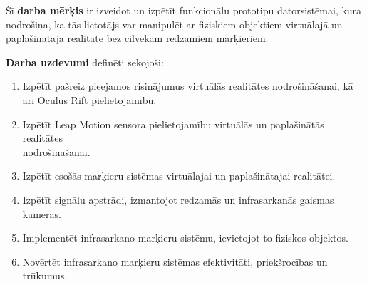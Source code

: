 \documentclass[12pt, a4paper, oneside, openright]{article}
\begin{document}
\par
Šī \textbf{darba mērķis} ir izveidot un izpētīt funkcionālu prototipu datorsistēmai, kura nodrošina,
ka tās lietotājs var manipulēt ar fiziskiem objektiem virtuālajā un paplašinātajā realitātē bez cilvēkam redzamiem 
marķieriem.

\par
\textbf{Darba uzdevumi} definēti sekojoši:
\begin{enumerate}
\item Izpētīt pašreiz pieejamos risinājumus virtuālās realitātes
nodrošināšanai, kā arī Oculus Rift pielietojamību.
\item Izpētīt Leap Motion sensora pielietojamību virtuālās un paplašinātās realitātes \\ nodrošināšanai.
\item Izpētīt esošās marķieru sistēmas virtuālajai un paplašinātajai realitātei.
\item Izpētīt signālu apstrādi, izmantojot redzamās un infrasarkanās gaismas kameras.
\item Implementēt infrasarkano marķieru sistēmu, ievietojot to fiziskos objektos.
\item Novērtēt infrasarkano marķieru sistēmas efektivitāti, priekšrocības un trūkumus.
\end{enumerate}
\end{document}
